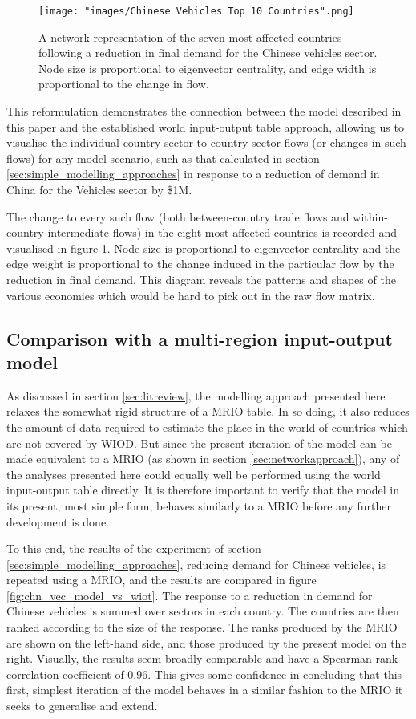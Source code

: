 \documentclass{article}
\begin{document}
\begin{figure}[tb]
\centering
\texttt{[image: "images/Chinese Vehicles Top 10 Countries".png]}
\caption{A network representation of the seven most-affected countries following a reduction in final demand for the Chinese vehicles sector. Node size is proportional to eigenvector centrality, and edge width is proportional to the change in flow.}\label{fig:chnvehtop6}
\end{figure}

This reformulation demonstrates the connection between the model described in this paper and the established world input-output table approach, allowing us to visualise the individual country-sector to country-sector flows (or changes in such flows) for any model scenario, such as that calculated in section \ref{sec:simple_modelling_approaches} in response to a reduction of demand in China for the Vehicles sector by \$1M.

The change to every such flow (both between-country trade flows and within-country intermediate flows) in the eight most-affected countries is recorded and visualised in figure \ref{fig:chnvehtop6}.
Node size is proportional to eigenvector centrality and the edge weight is proportional to the change induced in the particular flow by the reduction in final demand.
This diagram reveals the patterns and shapes of the various economies which would be hard to pick out in the raw flow matrix.

\subsection{Comparison with a multi-region input-output model}
As discussed in section \ref{sec:litreview}, the modelling approach presented here relaxes the somewhat rigid structure of a MRIO table.
In so doing, it also reduces the amount of data required to estimate the place in the world of countries which are not covered by WIOD.
But since the present iteration of the model can be made equivalent to a MRIO (as shown in section \ref{sec:networkapproach}), any of the analyses presented here could equally well be performed using the world input-output table directly.
It is therefore important to verify that the model in its present, most simple form, behaves similarly to a MRIO before any further development is done.

To this end, the results of the experiment of section \ref{sec:simple_modelling_approaches}, reducing demand for Chinese vehicles, is repeated using a MRIO, and the results are compared in figure \ref{fig:chn_vec_model_vs_wiot}.
The response to a reduction in demand for Chinese vehicles is summed over sectors in each country.
The countries are then ranked according to the size of the response.
The ranks produced by the MRIO are shown on the left-hand side, and those produced by the present model on the right.
Visually, the results seem broadly comparable and have a Spearman rank correlation coefficient \parencite{spearman_proof_1904} of 0.96.
This gives some confidence in concluding that this first, simplest iteration of the model behaves in a similar fashion to the MRIO it seeks to generalise and extend.
\end{document}
